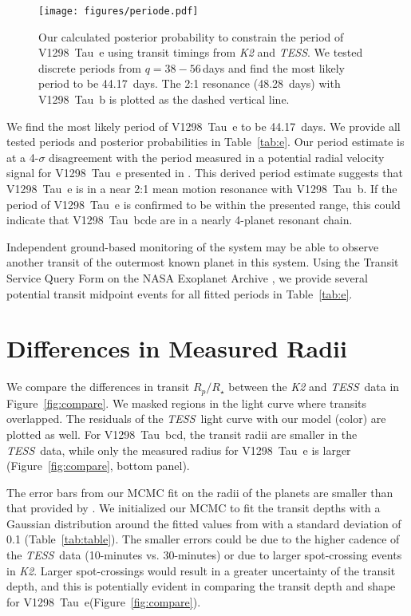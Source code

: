 \documentclass[twocolumn]{aastex631}
\newcommand{\githubicon}{{\color{black}\faGithub}}
\newcommand{\tess}{\textit{TESS}}
\newcommand{\allplanets}{V1298~Tau~bcde\xspace}
\newcommand{\planetb}{V1298~Tau~b\xspace}
\newcommand{\planete}{V1298~Tau~e\xspace}
\newcommand{\planetknown}{V1298~Tau~bcd\xspace}
\begin{document}
\begin{figure}[h]
\begin{center}
\texttt{[image: figures/periode.pdf]}
\caption{Our calculated posterior probability to constrain the period of \planete using transit timings from \textit{K2} and \tess. We tested discrete periods from $q=38-56$\,days and find the most likely period to be 44.17~days. The 2:1 resonance (48.28~days) with \planetb is plotted as the dashed vertical line. \href{https://github.com/afeinstein20/v1298tau\_tess/blob/main/src/figures/period\_e.py}{\githubicon}} \label{fig:period_e}
\end{center}
\end{figure}

We find the most likely period of \planete to be 44.17~days. We provide all tested periods and posterior probabilities in Table~\ref{tab:e}. Our period estimate is at a 4-$\sigma$ disagreement with the period measured in a potential radial velocity signal for \planete presented in \cite{suarez21}. This derived period estimate suggests that \planete is in a near 2:1 mean motion resonance with \planetb. If the period of \planete is confirmed to be within the presented range, this could indicate that \allplanets are in a nearly 4-planet resonant chain.

Independent ground-based monitoring of the system may be able to observe another transit of the outermost known planet in this system. Using the Transit Service Query Form on the NASA Exoplanet Archive \citep{Akeson2013}, we provide several potential transit midpoint events for all fitted periods in Table~\ref{tab:e}.

\section{Differences in Measured Radii} \label{sec:radii}

We compare the differences in transit $R_p/R_\star$ between the \textit{K2} and \tess\ data in Figure~\ref{fig:compare}. We masked regions in the light curve where transits overlapped. The residuals of the \tess\ light curve with our model (color) are plotted as well. For \planetknown, the transit radii are smaller in the \tess\ data, while only the measured radius for \planete is larger (Figure~\ref{fig:compare}, bottom panel).

The error bars from our MCMC fit on the radii of the planets are smaller than that provided by \cite{David2019b}. We initialized our MCMC to fit the transit depths with a Gaussian distribution around the fitted values from \cite{David2019b} with a standard deviation of 0.1 (Table~\ref{tab:table}). The smaller errors could be due to the higher cadence of the \tess\ data (10-minutes vs. 30-minutes) or due to larger spot-crossing events in \textit{K2}. Larger spot-crossings would result in a greater uncertainty of the transit depth, and this is potentially evident in comparing the transit depth and shape for \planete (Figure~\ref{fig:compare}).
\end{document}
